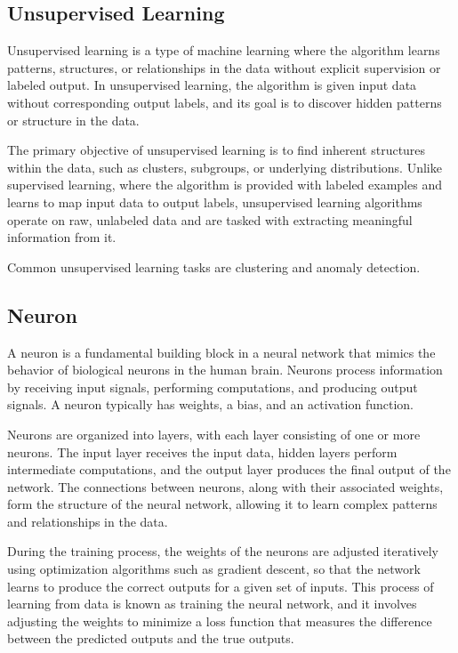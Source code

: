\documentclass[a4paper]{article}
\begin{document}
\subsection*{Unsupervised Learning}
Unsupervised learning is a type of machine learning where the algorithm learns patterns, structures, or relationships in the data without explicit supervision or labeled output. In unsupervised learning, the algorithm is given input data without corresponding output labels, and its goal is to discover hidden patterns or structure in the data.

The primary objective of unsupervised learning is to find inherent structures within the data, such as clusters, subgroups, or underlying distributions. Unlike supervised learning, where the algorithm is provided with labeled examples and learns to map input data to output labels, unsupervised learning algorithms operate on raw, unlabeled data and are tasked with extracting meaningful information from it.

Common unsupervised learning tasks are clustering and anomaly detection.


\subsection*{Neuron}
A neuron is a fundamental building block in a neural network that mimics the behavior of biological neurons in the human brain. Neurons process information by receiving input signals, performing computations, and producing output signals. A neuron typically has weights, a bias, and an activation function.

Neurons are organized into layers, with each layer consisting of one or more neurons. The input layer receives the input data, hidden layers perform intermediate computations, and the output layer produces the final output of the network. The connections between neurons, along with their associated weights, form the structure of the neural network, allowing it to learn complex patterns and relationships in the data.

During the training process, the weights of the neurons are adjusted iteratively using optimization algorithms such as gradient descent, so that the network learns to produce the correct outputs for a given set of inputs. This process of learning from data is known as training the neural network, and it involves adjusting the weights to minimize a loss function that measures the difference between the predicted outputs and the true outputs.
\end{document}
